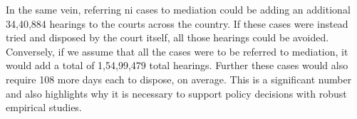 In the same vein, referring \gls{ni} cases to mediation could be
adding an additional 34,40,884 hearings to the courts across the
country. If these cases were instead tried and disposed by the court
itself, all those hearings could be avoided. Conversely, if we assume
that all the cases were to be referred to mediation, it would add a
total of 1,54,99,479 total hearings. Further these cases would also
require 108 more days each to dispose, on average. This is a
significant number and also highlights why it is necessary to support
policy decisions with robust empirical studies.

